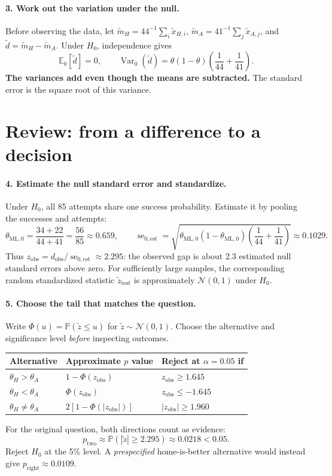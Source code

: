\documentclass[11pt]{article}
\newcommand{\rv}[1]{\widetilde{#1}}
\newcommand{\E}{\mathbb E}
\newcommand{\Pbb}{\mathbb P}
\newcommand{\Var}{\operatorname{Var}}
\newcommand{\se}{\operatorname{se}}
\begin{document}
\paragraph{3. Work out the variation under the null.}
Before observing the data, let
$\rv m_H=44^{-1}\sum_i\rv x_{H,i}$,
$\rv m_A=41^{-1}\sum_j\rv x_{A,j}$, and $\rv d=\rv m_H-\rv m_A$.
Under $H_0$, independence gives
\[
 \E_0[\rv d]=0,\qquad
 \Var_0(\rv d)=\theta(1-\theta)
 \left(\frac1{44}+\frac1{41}\right).
\]
\textbf{The variances add even though the means are subtracted.}
The standard error is the square root of this variance.

\newpage
\section*{Review: from a difference to a decision}
\paragraph{4. Estimate the null standard error and standardize.}
Under $H_0$, all 85 attempts share one success probability. Estimate it by
pooling the successes and attempts:
\[
 \theta_{\mathrm{ML},0}=\frac{34+22}{44+41}=\frac{56}{85}\approx0.659,
 \qquad
 \se_{0,\mathrm{est}}=
 \sqrt{\theta_{\mathrm{ML},0}(1-\theta_{\mathrm{ML},0})
 \left(\frac1{44}+\frac1{41}\right)}\approx0.1029.
\]
Thus $z_{\mathrm{obs}}=d_{\mathrm{obs}}/\se_{0,\mathrm{est}}\approx2.295$:
the observed gap is about 2.3 estimated null standard errors above zero.
For sufficiently large samples, the corresponding random standardized
statistic $\rv z_{\mathrm{test}}$ is approximately $\mathcal N(0,1)$ under $H_0$.

\paragraph{5. Choose the tail that matches the question.}
Write $\Phi(u)=\Pbb(\rv z\leq u)$ for $\rv z\sim\mathcal N(0,1)$.
Choose the alternative and significance level \emph{before} inspecting outcomes.
\begin{center}
\begin{tabular}{@{}lll@{}}
\toprule Alternative & Approximate $p$ value & Reject at $\alpha=0.05$ if\\\midrule
$\theta_H>\theta_A$ & $1-\Phi(z_{\mathrm{obs}})$ & $z_{\mathrm{obs}}\geq1.645$\\
$\theta_H<\theta_A$ & $\Phi(z_{\mathrm{obs}})$ & $z_{\mathrm{obs}}\leq-1.645$\\
$\theta_H\ne\theta_A$ & $2[1-\Phi(|z_{\mathrm{obs}}|)]$ & $|z_{\mathrm{obs}}|\geq1.960$\\
\bottomrule
\end{tabular}
\end{center}
For the original question, both directions count as evidence:
\[
 p_{\mathrm{two}}\approx\Pbb(|\rv z|\geq2.295)\approx0.0218<0.05.
\]
Reject $H_0$ at the 5\% level. A \emph{prespecified} home-is-better alternative
would instead give $p_{\mathrm{right}}\approx0.0109$.
\end{document}
